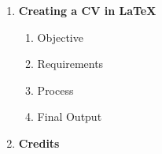\begin{enumerate}
    \item \textbf{Creating a CV in LaTeX}
    \begin{enumerate}
        \renewcommand{\labelenumii}{\arabic{enumi}.\arabic{enumii}}
        \item Objective
        \item Requirements
        \item Process
        \item Final Output
    \end{enumerate}

    \item \textbf{Credits}
\end{enumerate}
